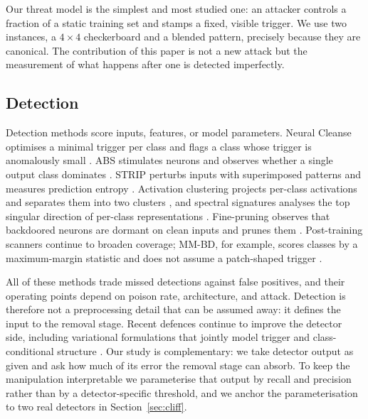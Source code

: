 Our threat model is the simplest and most studied one: an attacker controls a
fraction of a static training set and stamps a fixed, visible trigger. We use two
instances, a $4\times4$ checkerboard and a blended pattern, precisely because
they are canonical. The contribution of this paper is not a new attack but the
measurement of what happens after one is detected imperfectly.

\subsection{Detection}
Detection methods score inputs, features, or model parameters. Neural Cleanse
optimises a minimal trigger per class and flags a class whose trigger is
anomalously small \cite{nc}. ABS stimulates neurons and observes whether a
single output class dominates \cite{abs}. STRIP perturbs inputs with
superimposed patterns and measures prediction entropy \cite{strip}. Activation
clustering projects per-class activations and separates them into two clusters
\cite{ac}, and spectral signatures analyses the top singular direction of
per-class representations \cite{ss}. Fine-pruning observes that backdoored
neurons are dormant on clean inputs and prunes them \cite{finepruning}.
Post-training scanners continue to broaden coverage; MM-BD, for example, scores
classes by a maximum-margin statistic and does not assume a patch-shaped
trigger \cite{mmbd}.

All of these methods trade missed detections against false positives, and their
operating points depend on poison rate, architecture, and attack. Detection is
therefore not a preprocessing detail that can be assumed away: it defines the
input to the removal stage. Recent defences continue to improve the detector
side, including variational formulations that jointly model trigger and
class-conditional structure \cite{seal}. Our study is complementary: we take
detector output as given and ask how much of its error the removal stage can
absorb. To keep the manipulation interpretable we parameterise that output by
recall and precision rather than by a detector-specific threshold, and we anchor
the parameterisation to two real detectors in Section~\ref{sec:cliff}.

